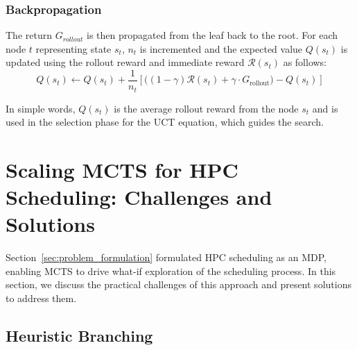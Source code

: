 \documentclass[conference]{IEEEtran}
\begin{document}
\subsubsection{Backpropagation} 
\label{sec:backpropagation}
The return $G_{rollout}$ is then propagated from the leaf back to the root. For each node $t$ representing state $s_t$, $n_t$ is incremented and the expected value $Q(s_t)$ is updated using the rollout reward and immediate reward $\mathcal{R}(s_t)$ as follows:
\begin{equation}
    Q(s_t) \gets Q(s_t) + \frac{1}{n_t} \left[ \Big( (1 - \gamma)\mathcal{R}(s_t) + \gamma \cdot G_{\text{rollout}} \Big) - Q(s_t) \right]
\end{equation}

In simple words, $Q(s_t)$ is the average rollout reward from the node $s_t$ and is used in the selection phase for the UCT equation, which guides the search.


\section{Scaling MCTS for HPC Scheduling: Challenges and Solutions}
\label{sec:implementation}

Section~\ref{sec:problem_formulation} formulated HPC scheduling as an MDP, enabling MCTS to drive what-if exploration of the scheduling process. 
In this section, we discuss the practical challenges of this approach and present solutions to address them.

\subsection{Heuristic Branching}
\label{sec:heuristic_branching}


\end{document}
